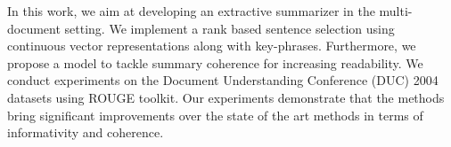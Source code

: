 In this work, we aim at developing an extractive summarizer in the multi-document setting. We implement a rank based sentence selection using continuous vector representations along with key-phrases. Furthermore, we propose a model to tackle summary coherence for increasing readability.  We conduct experiments on the Document Understanding Conference (DUC) 2004 datasets using ROUGE toolkit. Our experiments demonstrate that the methods bring significant improvements over the state of the art methods in terms of informativity and coherence.
